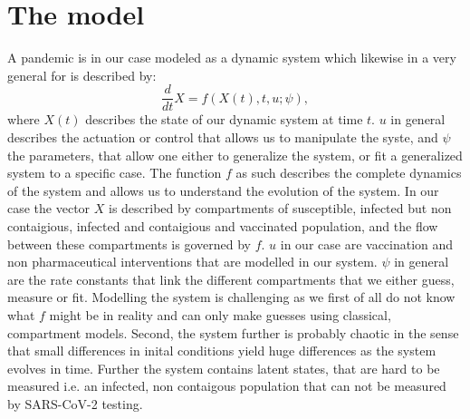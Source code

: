 \documentclass[a4paper,12pt]{article}
\begin{document}
\section{The model}\label{sec-model}
A pandemic is in our case modeled as a dynamic system which likewise
in a very general for is described by:
\begin{equation}
  \frac{d}{dt}X = f(X(t),t,u;\psi), \label{eqn-system}
\end{equation}
where $X(t)$ describes the state of our dynamic system at time
$t$. $u$ in general describes the actuation or control that allows us
to manipulate the syste, and $\psi$ the parameters, that allow one
either to generalize the system, or fit a generalized system to a
specific case. The function $f$ as such describes the complete
dynamics of the system and allows us to understand the evolution of
the system. In our case the vector $X$ is described by compartments of
susceptible, infected but non contaigious, infected and contaigious and
vaccinated population, and the flow between these compartments is
governed by $f$. $u$ in our case are vaccination and non
pharmaceutical interventions that are modelled in our system. $\psi$
in general are the rate constants that link the different compartments
that we either guess, measure or fit. Modelling the system is
challenging as we first of all do not know what $f$ might be in
reality and can only make guesses using classical,
compartment models. Second, the system further is probably chaotic in the sense
that small differences in inital conditions yield huge differences as
the system evolves in time. Further the system contains latent
states, that are hard to be measured i.e. an infected, non contaigous
population that can not be measured by SARS-CoV-2 testing.
\end{document}
